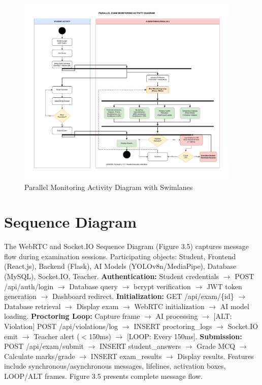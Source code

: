\begin{figure}[ht]
    \centering
    \includegraphics[width=0.95\textwidth]{Chap3/activity}
    \caption{Parallel Monitoring Activity Diagram with Swimlanes}
    \label{fig:activity}
\end{figure}

\section{Sequence Diagram}

The WebRTC and Socket.IO Sequence Diagram (Figure 3.5) captures message flow during examination sessions. Participating objects: Student, Frontend (React.js), Backend (Flask), AI Models (YOLOv8n/MediaPipe), Database (MySQL), Socket.IO, Teacher. \textbf{Authentication:} Student credentials $\rightarrow$ POST /api/auth/login $\rightarrow$ Database query $\rightarrow$ bcrypt verification $\rightarrow$ JWT token generation $\rightarrow$ Dashboard redirect. \textbf{Initialization:} GET /api/exam/\{id\} $\rightarrow$ Database retrieval $\rightarrow$ Display exam $\rightarrow$ WebRTC initialization $\rightarrow$ AI model loading. \textbf{Proctoring Loop:} Capture frame $\rightarrow$ AI processing $\rightarrow$ [ALT: Violation] POST /api/violations/log $\rightarrow$ INSERT proctoring\_logs $\rightarrow$ Socket.IO emit $\rightarrow$ Teacher alert ($<$150ms) $\rightarrow$ [LOOP: Every 150ms]. \textbf{Submission:} POST /api/exam/submit $\rightarrow$ INSERT student\_answers $\rightarrow$ Grade MCQ $\rightarrow$ Calculate marks/grade $\rightarrow$ INSERT exam\_results $\rightarrow$ Display results. Features include synchronous/asynchronous messages, lifelines, activation boxes, LOOP/ALT frames. Figure 3.5 presents complete message flow.

